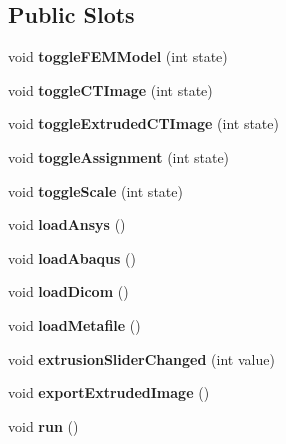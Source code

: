 \subsection*{Public Slots}
\begin{DoxyCompactItemize}
\item 
\hypertarget{class_main_window_a5c21c294f98763076a24f2f9d28833db}{
void {\bfseries toggleFEMModel} (int state)}
\label{class_main_window_a5c21c294f98763076a24f2f9d28833db}

\item 
\hypertarget{class_main_window_ac2540c55a6dba3ad9969d81f828ad3ab}{
void {\bfseries toggleCTImage} (int state)}
\label{class_main_window_ac2540c55a6dba3ad9969d81f828ad3ab}

\item 
\hypertarget{class_main_window_a749ddefba9d060bb4fe629a0fe4e55cc}{
void {\bfseries toggleExtrudedCTImage} (int state)}
\label{class_main_window_a749ddefba9d060bb4fe629a0fe4e55cc}

\item 
\hypertarget{class_main_window_afd2145f5ff69c13ceb4c9a55f4acc21e}{
void {\bfseries toggleAssignment} (int state)}
\label{class_main_window_afd2145f5ff69c13ceb4c9a55f4acc21e}

\item 
\hypertarget{class_main_window_abfd7774ac32c26f29cb3a9a79d88a6b4}{
void {\bfseries toggleScale} (int state)}
\label{class_main_window_abfd7774ac32c26f29cb3a9a79d88a6b4}

\item 
\hypertarget{class_main_window_ad51609d79fe94b59ba44a38edba4aaca}{
void {\bfseries loadAnsys} ()}
\label{class_main_window_ad51609d79fe94b59ba44a38edba4aaca}

\item 
\hypertarget{class_main_window_a7388a55ec0ccefa2439e3c6bea9b64a3}{
void {\bfseries loadAbaqus} ()}
\label{class_main_window_a7388a55ec0ccefa2439e3c6bea9b64a3}

\item 
\hypertarget{class_main_window_abb9a279c4a3c2204e57dbf5386b7784a}{
void {\bfseries loadDicom} ()}
\label{class_main_window_abb9a279c4a3c2204e57dbf5386b7784a}

\item 
\hypertarget{class_main_window_adaf378c5395bf283229d2df7fac3a350}{
void {\bfseries loadMetafile} ()}
\label{class_main_window_adaf378c5395bf283229d2df7fac3a350}

\item 
\hypertarget{class_main_window_aa5b0bfe0182e221a2c8987cd3d9d516c}{
void {\bfseries extrusionSliderChanged} (int value)}
\label{class_main_window_aa5b0bfe0182e221a2c8987cd3d9d516c}

\item 
\hypertarget{class_main_window_a0a0760a048d47d05cbefdd06053a1d19}{
void {\bfseries exportExtrudedImage} ()}
\label{class_main_window_a0a0760a048d47d05cbefdd06053a1d19}

\item 
\hypertarget{class_main_window_aa506f7b11499c888e70d2cb9bf5a1f6a}{
void {\bfseries run} ()}
\label{class_main_window_aa506f7b11499c888e70d2cb9bf5a1f6a}

\end{DoxyCompactItemize}
